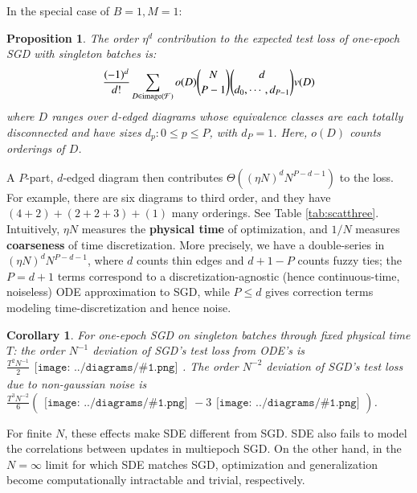 \documentclass{article}
\newtheorem{cor}{Corollary}
\newtheorem{prop}{Proposition}
\newcommand{\Free}{\mathcal{F}}
\newcommand{\image}{\text{\textnormal{image}}}
\newcommand{\wrap}[1]{\left( #1 \right)}
\newcommand{\dia} [1]{\begin{gathered}\texttt{[image: ../diagrams/\#1.png]}\end{gathered}}
\newcommand{\sdia}[1]{\begin{gathered}\texttt{[image: ../diagrams/\#1.png]}\end{gathered}}
\begin{document}
    In the special case of $B=1, M=1$:
    \begin{prop}
        The order $\eta^d$ contribution to the expected test loss of one-epoch
        SGD with singleton batches is:
        \begin{equation}\label{eq:sgdbasiccoef}
            \frac{(-1)^d}{d!} \sum_{D\in \image(\Free)} 
            o(D) {N \choose P-1} {d \choose d_0,\cdots,d_{P-1}}
            v(D)
        \end{equation}
        where $D$ ranges over $d$-edged diagrams whose equivalence classes
        are each totally disconnected and have
        sizes $d_p: 0\leq p\leq P$, with $d_P=1$.
        Here, $o(D)$ counts orderings of $D$.
    \end{prop}
    A $P$-part, $d$-edged diagram then contributes $\Theta\left((\eta N)^d
    N^{P-d-1}\right)$ to the loss.  For example, there are six diagrams to
    third order, and they have $(4+2)+(2+2+3)+(1)$ many orderings.  See Table
    \ref{tab:scatthree}.  Intuitively, $\eta N$ measures the {\bf physical
    time} of optimization, and $1/N$ measures {\bf coarseness} of time
    discretization.  More precisely, we have a double-series in $(\eta N)^d
    N^{P-d-1}$, where $d$ counts thin edges and $d+1-P$ counts fuzzy ties; the
    $P=d+1$ terms correspond to a discretization-agnostic (hence
    continuous-time, noiseless) ODE approximation to SGD, while $P\leq d$ gives
    correction terms modeling time-discretization and hence noise.  
    \begin{cor}
        For one-epoch SGD on singleton batches through fixed physical time $T$:
        the order $N^{-1}$ deviation of SGD's test loss from ODE's is
        $
            \frac{T^2 N^{-1}}{2} \dia{c(01-2)(02-12)}
        $.
        The order $N^{-2}$ deviation of SGD's test loss due to non-gaussian
        noise is
        $
            \frac{T^3 N^{-2}}{6} \wrap{\sdia{c(012-3)(03-13-23)} - 3 \sdia{c(01-2-3)(03-13-23)}}
        $.
    \end{cor}
    For finite $N$, these effects make SDE different from SGD.  SDE also fails
    to model the correlations between updates in multiepoch SGD.  On the other
    hand, in the $N=\infty$ limit for which SDE matches SGD, optimization and
    generalization become computationally intractable and trivial,
    respectively. 
\end{document}
